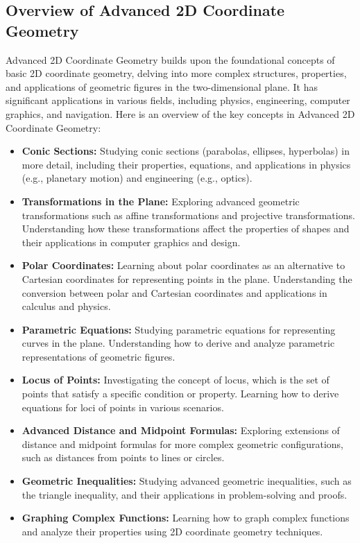 \documentclass[openany]{book}
\begin{document}
\subsection{Overview of Advanced 2D Coordinate Geometry}
Advanced 2D Coordinate Geometry builds upon the foundational concepts of basic 2D coordinate geometry, delving into more complex structures, properties, and applications of geometric figures in the two-dimensional plane. It has significant applications in various fields, including physics, engineering, computer graphics, and navigation. Here is an overview of the key concepts in Advanced 2D Coordinate Geometry:
\begin{itemize}
    \item \textbf{Conic Sections:} Studying conic sections (parabolas, ellipses, hyperbolas) in more detail, including their properties, equations, and applications in physics (e.g., planetary motion) and engineering (e.g., optics).
    \item \textbf{Transformations in the Plane:} Exploring advanced geometric transformations such as affine transformations and projective transformations. Understanding how these transformations affect the properties of shapes and their applications in computer graphics and design.
    \item \textbf{Polar Coordinates:} Learning about polar coordinates as an alternative to Cartesian coordinates for representing points in the plane. Understanding the conversion between polar and Cartesian coordinates and applications in calculus and physics.
    \item \textbf{Parametric Equations:} Studying parametric equations for representing curves in the plane. Understanding how to derive and analyze parametric representations of geometric figures.
    \item \textbf{Locus of Points:} Investigating the concept of locus, which is the set of points that satisfy a specific condition or property. Learning how to derive equations for loci of points in various scenarios.
    \item \textbf{Advanced Distance and Midpoint Formulas:} Exploring extensions of distance and midpoint formulas for more complex geometric configurations, such as distances from points to lines or circles.
    \item \textbf{Geometric Inequalities:} Studying advanced geometric inequalities, such as the triangle inequality, and their applications in problem-solving and proofs.
    \item \textbf{Graphing Complex Functions:} Learning how to graph complex functions and analyze their properties using 2D coordinate geometry techniques.

\end{itemize}
\end{document}
